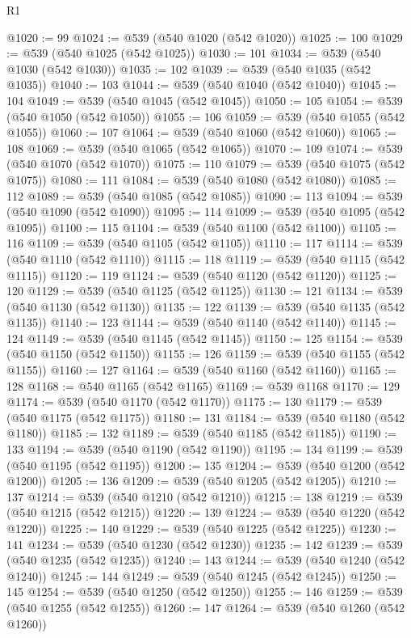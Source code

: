 \begin{lexlean}{R1}
\begin{coremodule}
@1020 := 99
@1024 := @539 (@540 @1020 (@542 @1020))
@1025 := 100
@1029 := @539 (@540 @1025 (@542 @1025))
@1030 := 101
@1034 := @539 (@540 @1030 (@542 @1030))
@1035 := 102
@1039 := @539 (@540 @1035 (@542 @1035))
@1040 := 103
@1044 := @539 (@540 @1040 (@542 @1040))
@1045 := 104
@1049 := @539 (@540 @1045 (@542 @1045))
@1050 := 105
@1054 := @539 (@540 @1050 (@542 @1050))
@1055 := 106
@1059 := @539 (@540 @1055 (@542 @1055))
@1060 := 107
@1064 := @539 (@540 @1060 (@542 @1060))
@1065 := 108
@1069 := @539 (@540 @1065 (@542 @1065))
@1070 := 109
@1074 := @539 (@540 @1070 (@542 @1070))
@1075 := 110
@1079 := @539 (@540 @1075 (@542 @1075))
@1080 := 111
@1084 := @539 (@540 @1080 (@542 @1080))
@1085 := 112
@1089 := @539 (@540 @1085 (@542 @1085))
@1090 := 113
@1094 := @539 (@540 @1090 (@542 @1090))
@1095 := 114
@1099 := @539 (@540 @1095 (@542 @1095))
@1100 := 115
@1104 := @539 (@540 @1100 (@542 @1100))
@1105 := 116
@1109 := @539 (@540 @1105 (@542 @1105))
@1110 := 117
@1114 := @539 (@540 @1110 (@542 @1110))
@1115 := 118
@1119 := @539 (@540 @1115 (@542 @1115))
@1120 := 119
@1124 := @539 (@540 @1120 (@542 @1120))
@1125 := 120
@1129 := @539 (@540 @1125 (@542 @1125))
@1130 := 121
@1134 := @539 (@540 @1130 (@542 @1130))
@1135 := 122
@1139 := @539 (@540 @1135 (@542 @1135))
@1140 := 123
@1144 := @539 (@540 @1140 (@542 @1140))
@1145 := 124
@1149 := @539 (@540 @1145 (@542 @1145))
@1150 := 125
@1154 := @539 (@540 @1150 (@542 @1150))
@1155 := 126
@1159 := @539 (@540 @1155 (@542 @1155))
@1160 := 127
@1164 := @539 (@540 @1160 (@542 @1160))
@1165 := 128
@1168 := @540 @1165 (@542 @1165)
@1169 := @539 @1168
@1170 := 129
@1174 := @539 (@540 @1170 (@542 @1170))
@1175 := 130
@1179 := @539 (@540 @1175 (@542 @1175))
@1180 := 131
@1184 := @539 (@540 @1180 (@542 @1180))
@1185 := 132
@1189 := @539 (@540 @1185 (@542 @1185))
@1190 := 133
@1194 := @539 (@540 @1190 (@542 @1190))
@1195 := 134
@1199 := @539 (@540 @1195 (@542 @1195))
@1200 := 135
@1204 := @539 (@540 @1200 (@542 @1200))
@1205 := 136
@1209 := @539 (@540 @1205 (@542 @1205))
@1210 := 137
@1214 := @539 (@540 @1210 (@542 @1210))
@1215 := 138
@1219 := @539 (@540 @1215 (@542 @1215))
@1220 := 139
@1224 := @539 (@540 @1220 (@542 @1220))
@1225 := 140
@1229 := @539 (@540 @1225 (@542 @1225))
@1230 := 141
@1234 := @539 (@540 @1230 (@542 @1230))
@1235 := 142
@1239 := @539 (@540 @1235 (@542 @1235))
@1240 := 143
@1244 := @539 (@540 @1240 (@542 @1240))
@1245 := 144
@1249 := @539 (@540 @1245 (@542 @1245))
@1250 := 145
@1254 := @539 (@540 @1250 (@542 @1250))
@1255 := 146
@1259 := @539 (@540 @1255 (@542 @1255))
@1260 := 147
@1264 := @539 (@540 @1260 (@542 @1260))

\end{coremodule}
\end{lexlean}

